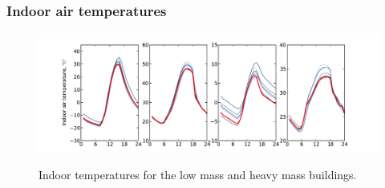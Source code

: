 \subsubsection{Indoor air temperatures}

\begin{figure}[ht]
\includegraphics[width=\textwidth]{Buildings/MyGraphics/Temp_BESTEST.pdf}
\label{fig:Temp_BESTEST}
\caption{Indoor temperatures for the low mass and heavy mass buildings.} 
\end{figure}

%


